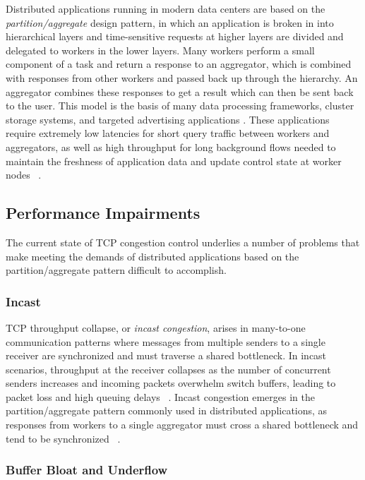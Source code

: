 Distributed applications running in modern data centers are based on the \emph{partition/aggregate} design pattern, in which an application is broken in into hierarchical layers and time-sensitive requests at higher layers are divided and delegated to workers in the lower layers. Many workers perform a small component of a task and return a response to an aggregator, which is combined with responses from other workers and passed back up through the hierarchy. An aggregator combines these responses to get a result which can then be sent back to the user. This model is the basis of many data processing frameworks, cluster storage systems, and targeted advertising applications \cite{chen_understanding_2009, dean_mapreduce:_2004, phanishayee_measurement_2008, alizadeh_data_2010}. These applications require extremely low latencies for short query traffic between workers and aggregators, as well as high throughput for long background flows needed to maintain the freshness of application data and update control state at worker nodes ~\cite{alizadeh_data_2010}. 

\subsection{Performance Impairments}

The current state of TCP congestion control underlies a number of problems that make meeting the demands of distributed applications based on the partition/aggregate pattern difficult to accomplish. 

\subsubsection{Incast}

TCP throughput collapse, or \emph{incast congestion}, arises in many-to-one communication patterns where messages from multiple senders to a single receiver are synchronized and must traverse a shared bottleneck. In incast scenarios, throughput at the receiver collapses as the number of concurrent senders increases and incoming packets overwhelm switch buffers, leading to packet loss and high queuing delays ~\cite{chen_understanding_2009, phanishayee_measurement_2008}. Incast congestion emerges in the partition/aggregate pattern commonly used in distributed applications, as responses from workers to a single aggregator must cross a shared bottleneck and tend to be synchronized ~\cite{alizadeh_data_2010}.

\subsubsection{Buffer Bloat and Underflow}

